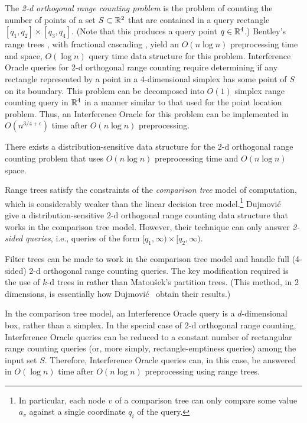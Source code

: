 \documentclass{patmorin}
\begin{document}
The \emph{2-d orthogonal range counting problem} is the problem of
counting the number of points of a set $S\subset\mathbb{R}^2$ that are contained
in a query rectangle $[q_1,q_2]\times[q_3,q_4]$. (Note that this
produces a query point $q\in \mathbb{R}^4$.) Bentley's range trees \cite{b75},
with fractional cascading \cite{cg86,l78}, yield an $O(n\log n)$
preprocessing time and space, $O(\log n)$ query time data structure
for this problem.  Interference Oracle queries for 2-d orthogonal
range counting require determining if any rectangle represented by a
point in a 4-dimensional simplex has some point of $S$ on its boundary.
This problem can be decomposed into $O(1)$ simplex range counting query in
$\mathbb{R}^4$ in a manner similar to that used for the point location problem.
Thus, an Interference Oracle for this problem can be implemented in
$O(n^{3/4+\epsilon})$ time after $O(n\log n)$ preprocessing.

\begin{thm}
  There exists a distribution-sensitive data structure for the 2-d
  orthogonal range counting problem that uses $O(n\log n)$ preprocessing
  time and $O(n\log n)$ space.
\end{thm}

Range trees satisfy the constraints of the \emph{comparison tree} model of
computation, which is considerably weaker than the linear decision tree
model.\footnote{In particular, each node $v$ of a comparison tree can
only compare some value $a_v$ against a single coordinate $q_i$ of the
query.} Dujmovi\'c \etal\ \cite{dhm09} give a distribution-sensitive 2-d
orthogonal range counting data structure that works in the comparison
tree model.  However, their technique can only answer \emph{2-sided
queries}, i.e., queries of the form $[q_1,\infty)\times[q_2,\infty)$.

Filter trees can be made to work in the comparison tree model
and handle full (4-sided) 2-d orthogonal range counting queries.
The key modification required is the use of $k$-d trees in
 rather than Matou\v{s}ek's partition
trees. (This method, in 2 dimensions, is essentially how Dujmovi\'c \etal\
obtain their results.)

In the comparison tree model, an Interference Oracle query is a
$d$-dimensional box, rather than a simplex. In the special case of
2-d orthogonal range counting, Interference Oracle queries can be
reduced to a constant number of rectangular range counting queries
(or, more simply, rectangle-emptiness queries) among the input set $S$.
Therefore, Interference Oracle queries can, in this case, be answered in
$O(\log n)$ time after $O(n\log n)$ preprocessing using range trees.
\end{document}
